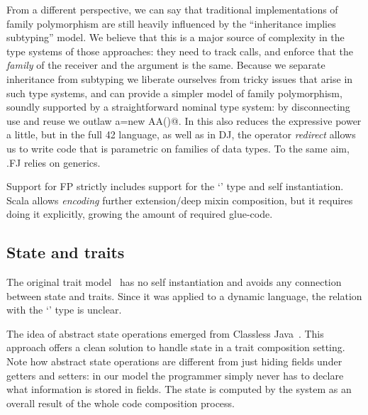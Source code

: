 From a different perspective, we can say that traditional
implementations of family polymorphism are still heavily influenced by
the ``inheritance implies subtyping'' model.
We believe that this is a major source of complexity in the type
systems of those approaches:
they need to track calls, and enforce that the \emph{family} of the receiver and the argument is the same.
Because we separate inheritance from subtyping we liberate ourselves
from tricky issues that arise in such type systems, and can
provide a simpler model of family polymorphism, soundly supported by 
a straightforward nominal type system:
by disconnecting use and reuse we outlaw \Q@A a=new AA()@.
In \name this also reduces the expressive power a little, but
in the full 42 language, as well as in DJ, the operator \emph{redirect} allows us to write code that is parametric on families of data types.
To the same aim, .FJ relies on generics.

Support for FP strictly includes
support for the `\Q@This@' type and self instantiation.
Scala allows \emph{encoding} further extension/deep mixin composition,
but it requires doing it explicitly, growing the amount of required glue-code.





\saveSpace
\subsection{State and traits}
\saveSpace
The original trait model~\cite{ducasse2006traits} has no self instantiation
and avoids any connection between state and traits.
Since it was applied to a dynamic language, the relation with the `\Q@This@' type is unclear.

The idea of abstract state operations emerged from Classless
Java~\cite{wang2016classless}. This approach offers a clean solution to handle state
in a trait composition setting.
Note how abstract state operations are different from just hiding fields under getters and setters: 
in our model the programmer simply never has to declare what information is stored in fields.
The state is computed by the system as an overall result of the whole code composition process.

